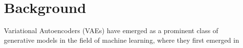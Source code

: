 \chapter{Background}



Variational Autoencoders (VAEs) have emerged as a prominent class of generative models in the field of machine learning, where they first emerged in 